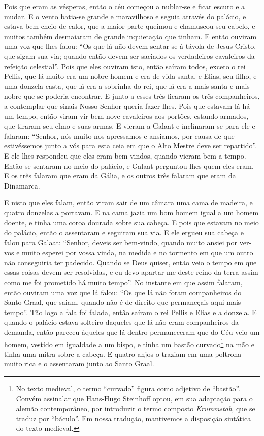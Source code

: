  Pois que eram as vésperas, então o céu começou a nublar-se e ficar escuro e a
mudar. E o vento batia-se grande e maravilhoso e seguia através do palácio, e
estava bem cheio de calor, que a maior parte queimou e chamuscou seu cabelo, e
muitos também desmaiaram de grande inquietação que tinham. E então ouviram uma
voz que lhes falou: “Os que lá não devem sentar-se à távola de Jesus Cristo,
que sigam sua via; quando então devem ser saciados os verdadeiros cavaleiros da
refeição celestial”. Pois que eles ouviram isto, então saíram todos,
exceto o rei Pellis, que lá muito era um nobre homem e era de vida santa, e
Elias, seu filho, e uma donzela casta, que lá era a sobrinha do rei, que lá era
a mais santa e mais nobre que se poderia encontrar. E junto a esses três
ficaram os três companheiros, a contemplar que sinais Nosso Senhor queria
fazer-lhes. Pois que estavam lá há um tempo, então viram vir bem nove
cavaleiros aos portões, estando armados, que tiraram seu elmo e suas armas. E
vieram a Galaat e inclinaram-se para ele e falaram: “Senhor, nós muito nos
apressamos e ansiamos, por causa de que estivéssemos junto a vós para esta ceia
em que o Alto Mestre deve ser repartido”. E ele lhes respondeu que eles eram
bem-vindos, quando vieram bem a tempo. Então se sentaram no meio do palácio, e
Galaat perguntou-lhes quem eles eram. E os três falaram que eram da Gália, e os
outros três falaram que eram da Dinamarca. 

E nisto que eles falam, então viram sair de um câmara uma cama de madeira, e
quatro donzelas a portavam. E na cama jazia um bom homem igual a um homem
doente, e tinha uma coroa dourada sobre sua cabeça. E pois que estavam no meio
do palácio,  então o assentaram e seguiram sua via. E ele ergueu sua cabeça e
falou para Galaat: “Senhor, deveis ser bem-vindo, quando muito ansiei por
ver-vos e muito esperei por vossa vinda, na medida e no tormento em que um
outro não conseguiria ter padecido. Quando se Deus quiser, então veio o tempo
em que essas coisas devem ser resolvidas, e eu devo apartar-me deste reino da
terra assim como me foi prometido há muito tempo”. No instante em que assim
falaram, então ouviram uma voz que lá falou: “Os que lá não foram companheiros
do Santo Graal, que saiam, quando não é de direito que permaneçais aqui mais
tempo”. Tão logo a fala foi falada, então saíram o rei Pellis e Elias
e a donzela. E quando o palácio estava solteiro daqueles que lá não eram
companheiros da demanda, então pareceu àqueles que lá dentro permaneceram que
do Céu veio um homem, vestido em igualdade a um bispo, e tinha um bastão
curvado\footnote{No texto medieval, o termo “curvado”  
figura como adjetivo de “bastão”. Convém assinalar que
Hans-Hugo Steinhoff optou, em sua adaptação para o alemão contemporâneo, por
introduzir o termo composto \textit{Krummstab}, que se traduz por “báculo”. Em
nossa tradução, mantivemos a disposição sintática do texto medieval.} 
na mão e tinha uma mitra sobre a cabeça. E quatro anjos o traziam em uma
poltrona muito rica e o assentaram junto ao Santo Graal. 

